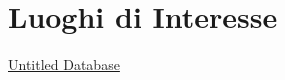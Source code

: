 \section{Luoghi di Interesse}\label{luoghi-di-interesse}

\href{Untitled\%20Database\%20765720d0312f4f0198e17c885b88af81.csv}{Untitled
Database}
